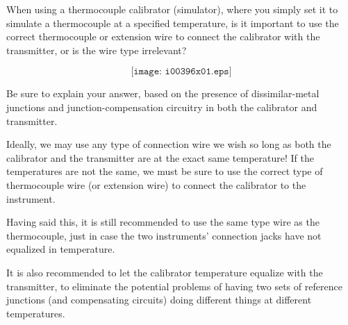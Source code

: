 

When using a thermocouple calibrator (simulator), where you simply set it to simulate a thermocouple at a specified temperature, is it important to use the correct thermocouple or extension wire to connect the calibrator with the transmitter, or is the wire type irrelevant?

$$\texttt{[image: i00396x01.eps]}$$

Be sure to explain your answer, based on the presence of dissimilar-metal junctions and junction-compensation circuitry in both the calibrator and transmitter.







Ideally, we may use any type of connection wire we wish so long as both the calibrator and the transmitter are at the exact same temperature!  If the temperatures are not the same, we must be sure to use the correct type of thermocouple wire (or extension wire) to connect the calibrator to the instrument.







Having said this, it is still recommended to use the same type wire as the thermocouple, just in case the two instruments' connection jacks have not equalized in temperature.

It is also recommended to let the calibrator temperature equalize with the transmitter, to eliminate the potential problems of having two sets of reference junctions (and compensating circuits) doing different things at different temperatures.




